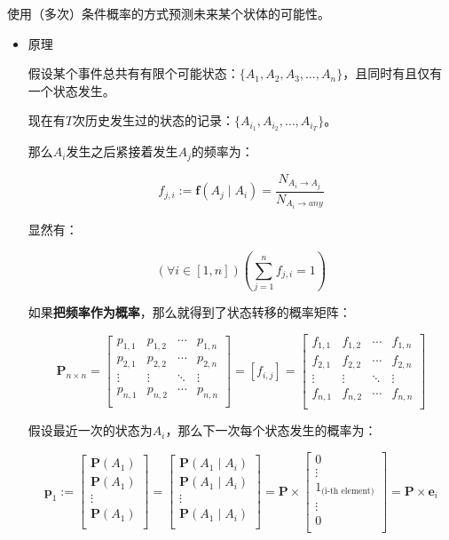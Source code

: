 \documentclass{article}
\begin{document}
使用（多次）条件概率的方式预测未来某个状体的可能性。

\begin{itemize}

\item{原理}

假设某个事件总共有有限个可能状态：$\{A_1, A_2, A_3, \ldots, A_n\}$，且同时有且仅有一个状态发生。

现在有$T$次历史发生过的状态的记录：$\{A_{i_1}, A_{i_2}, \ldots, A_{i_T}\}$。

那么$A_{i}$发生之后紧接着发生$A_{j}$的频率为：

\[f_{j, i}:=\mathbf{f}(A_j \mid A_i) = \frac{N_{A_i \rightarrow A_j}}{N_{A_i \rightarrow any}}\]

显然有：

\[(\forall i \in [1, n])\left(\sum_{j = 1}^{n} f_{j, i} = 1\right)\]

如果\textbf{把频率作为概率}，那么就得到了状态转移的概率矩阵：

\[\mathbf{P}_{n\times n} = \begin{bmatrix}
    p_{1, 1} & p_{1, 2} & \cdots & p_{1, n}\\
    p_{2, 1} & p_{2, 2} & \cdots & p_{2, n}\\
    \vdots & \vdots & \ddots  & \vdots\\
    p_{n, 1} & p_{n, 2} & \cdots & p_{n, n}\\
\end{bmatrix} = [f_{i, j}] = \begin{bmatrix}
    f_{1, 1} & f_{1, 2} & \cdots & f_{1, n}\\
    f_{2, 1} & f_{2, 2} & \cdots & f_{2, n}\\
    \vdots & \vdots & \ddots  & \vdots\\
    f_{n, 1} & f_{n, 2} & \cdots & f_{n, n}\\
\end{bmatrix}\]

假设最近一次的状态为$A_i$，那么下一次每个状态发生的概率为：

\[\mathbf{p}_1 := \begin{bmatrix}
    \mathbf{P}(A_1)\\
    \mathbf{P}(A_1)\\
    \vdots\\
    \mathbf{P}(A_1)\\
\end{bmatrix} = \begin{bmatrix}
    \mathbf{P}(A_1 \mid A_i)\\
    \mathbf{P}(A_1 \mid A_i)\\
    \vdots\\
    \mathbf{P}(A_1 \mid A_i)\\
\end{bmatrix} = \mathbf{P}\times\begin{bmatrix}
    0\\
    \vdots\\
    1_\text{(i-th element)}\\
    \vdots\\
    0\\
\end{bmatrix} = \mathbf{P} \times \mathbf{e}_i\]


\end{itemize}
\end{document}
